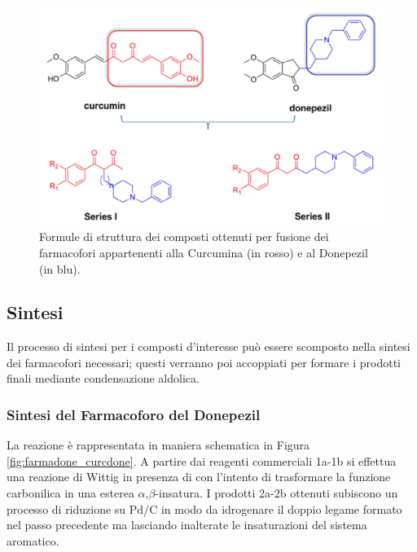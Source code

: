\documentclass[a4paper, 12pt]{article}
\begin{document}
\begin{figure}[H]
	\centering
	\includegraphics[width=\linewidth]{immagini/generale_curcdone.png}
	\caption{Formule di struttura dei composti ottenuti per fusione dei farmacofori appartenenti alla Curcumina (in rosso) e al Donepezil (in blu).}
	\label{fig:generale_curcdone}
\end{figure}



\subsection{Sintesi}
Il processo di sintesi per i composti d'interesse può essere scomposto nella sintesi dei farmacofori necessari; questi verranno poi accoppiati per formare i prodotti finali mediante condensazione aldolica.

\subsubsection{Sintesi del Farmacoforo del Donepezil}
\label{sec:sintesidone}
La reazione è rappresentata in maniera schematica in Figura \ref{fig:farmadone_curcdone}. A partire dai reagenti commerciali 1a-1b si effettua una reazione di Wittig in presenza di  con l'intento di trasformare la funzione carbonilica in una esterea $\alpha$,$\beta$-insatura. I prodotti 2a-2b ottenuti subiscono un processo di riduzione su Pd/C in modo da idrogenare il doppio legame formato nel passo precedente ma lasciando inalterate le insaturazioni del sistema aromatico.
\end{document}

